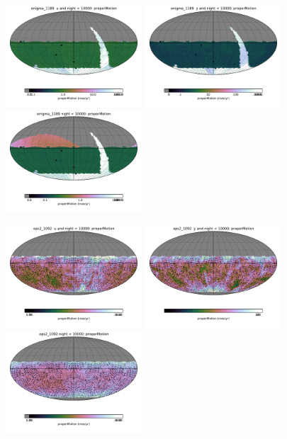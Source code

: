 \begin{figure}[ht]
  \begin{center}
  \includegraphics[width=2.0in]{./figs/milkyway/MW_Astrom_pmError_1189_u_map.pdf}
  \includegraphics[width=2.0in]{./figs/milkyway/MW_Astrom_pmError_1189_y_map.pdf}
  \includegraphics[width=2.0in]{./figs/milkyway/MW_Astrom_pmError_1189_10y_map.pdf}
  \end{center}
  \begin{center}
  \includegraphics[width=2.0in]{./figs/milkyway/MW_Astrom_pmError_1092_u_map.pdf}
  \includegraphics[width=2.0in]{./figs/milkyway/MW_Astrom_pmError_1092_y_map.pdf}
  \includegraphics[width=2.0in]{./figs/milkyway/MW_Astrom_pmError_1092_10y_map.pdf}
  \end{center}


\end{figure}
